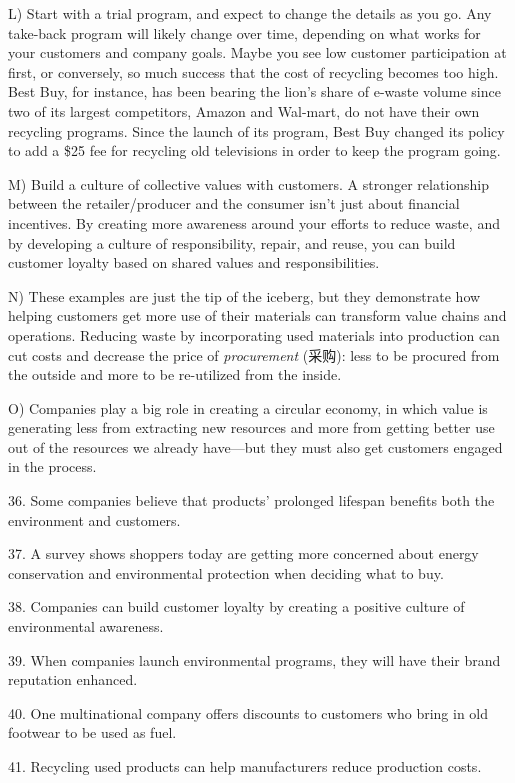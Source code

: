 \documentclass[UTF8,11pt]{ctexart}
\begin{document}
L) Start with a trial program, and expect to change the details as you go. Any take-back program will likely change over time, depending on what works for your customers and company goals. Maybe you see low customer participation at first, or conversely, so much success that the cost of recycling becomes too high. Best Buy, for instance, has been bearing the lion’s share of e-waste volume since two of its largest competitors, Amazon and Wal-mart, do not have their own recycling programs. Since the launch of its program, Best Buy changed its policy to add a \$25 fee for recycling old televisions in order to keep the program going.


M) Build a culture of collective values with customers. A stronger relationship between the retailer/producer and the consumer isn’t just about financial incentives. By creating more awareness around your efforts to reduce waste, and by developing a culture of responsibility, repair, and reuse, you can build customer loyalty based on shared values and responsibilities.


N) These examples are just the tip of the iceberg, but they demonstrate how helping customers get more use of their materials can transform value chains and operations. Reducing waste by incorporating used materials into production can cut costs and decrease the price of\textit{ procurement} (采购): less to be procured from the outside and more to be re-utilized from the inside.


O) Companies play a big role in creating a circular economy, in which value is generating less from extracting new resources and more from getting better use out of the resources we already have—but they must also get customers engaged in the process.


36. Some companies believe that products’ prolonged lifespan benefits both the environment and customers.


37. A survey shows shoppers today are getting more concerned about energy conservation and environmental protection when deciding what to buy.


38. Companies can build customer loyalty by creating a positive culture of environmental awareness.


39. When companies launch environmental programs, they will have their brand reputation enhanced.


40. One multinational company offers discounts to customers who bring in old footwear to be used as fuel.


41. Recycling used products can help manufacturers reduce production costs.
\end{document}
